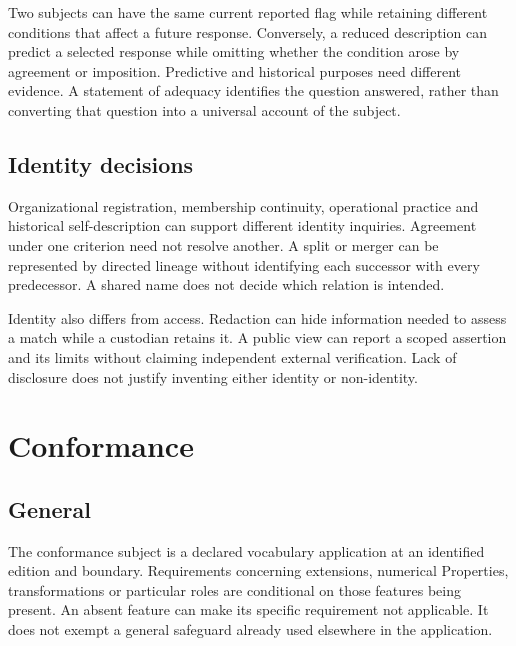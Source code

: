 \documentclass[11pt,a4paper]{article}
\begin{document}
Two subjects can have the same current reported flag while retaining different conditions that affect a future response. Conversely, a reduced description can predict a selected response while omitting whether the condition arose by agreement or imposition. Predictive and historical purposes need different evidence. A statement of adequacy identifies the question answered, rather than converting that question into a universal account of the subject.

\subsection{Identity decisions}

Organizational registration, membership continuity, operational practice and historical self-description can support different identity inquiries. Agreement under one criterion need not resolve another. A split or merger can be represented by directed lineage without identifying each successor with every predecessor. A shared name does not decide which relation is intended.

Identity also differs from access. Redaction can hide information needed to assess a match while a custodian retains it. A public view can report a scoped assertion and its limits without claiming independent external verification. Lack of disclosure does not justify inventing either identity or non-identity.

\section{Conformance}
\subsection{General}
The conformance subject is a declared vocabulary application at an identified edition and boundary. Requirements concerning extensions, numerical Properties, transformations or particular roles are conditional on those features being present. An absent feature can make its specific requirement not applicable. It does not exempt a general safeguard already used elsewhere in the application.
\end{document}
